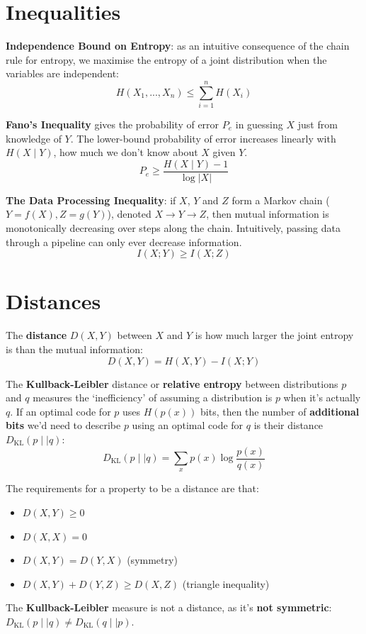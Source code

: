 \documentclass[a4paper, 11pt]{article}
\begin{document}
\section*{Inequalities}
{
    \textbf{Independence Bound on Entropy}: as an intuitive consequence of the chain rule for entropy, we maximise the entropy of a joint distribution when the variables are independent:
    \[H(X_1,...,X_n) \leq \sum_{i=1}^n{H(X_i)}\]

    \textbf{Fano's Inequality} gives the probability of error \(P_e\) in guessing \(X\) just from knowledge of \(Y\). The lower-bound probability of error increases linearly with \(H(X \mid Y)\), how much we don't know about \(X\) given \(Y\).
    \[P_e \geq \frac{H(X \mid Y) - 1}{\log{|X|}}\]

    \textbf{The Data Processing Inequality}: if \(X\), \(Y\) and \(Z\) form a Markov chain (\(Y = f(X),Z = g(Y)\)), denoted \(X \rightarrow Y \rightarrow Z\), then mutual information is monotonically decreasing over steps along the chain. Intuitively, passing data through a pipeline can only ever decrease information.
    \[I(X;Y) \geq I(X;Z)\]
}
\section*{Distances}
{
    The \textbf{distance} \(D(X,Y)\) between \(X\) and \(Y\) is how much larger the joint entropy is than the mutual information:
    \[D(X,Y) = H(X,Y) - I(X;Y)\]

    The \textbf{Kullback-Leibler} distance or \textbf{relative entropy} between distributions \(p\) and \(q\) measures the `inefficiency' of assuming a distribution is \(p\) when it's actually \(q\). If an optimal code for \(p\) uses \(H(p(x))\) bits, then the number of \textbf{additional bits} we'd need to describe \(p\) using an optimal code for \(q\) is their distance \(D_\text{KL}(p \mid\mid q)\):
    \[D_\text{KL}(p \mid\mid q) = \sum_x{p(x)\log\frac{p(x)}{q(x)}}\]

    The requirements for a property to be a distance are that:
    \begin{itemize}
    \item \(D(X,Y) \geq 0\)
    \item \(D(X,X) = 0\)
    \item \(D(X,Y) = D(Y,X)\) (symmetry)
    \item \(D(X,Y) + D(Y,Z) \geq D(X,Z)\) (triangle inequality)
    \end{itemize}

    The \textbf{Kullback-Leibler} measure is not a distance, as it's \textbf{not symmetric}: \(D_\text{KL}(p \mid\mid q)\neq D_\text{KL}(q \mid\mid p)\).
}
\end{document}
